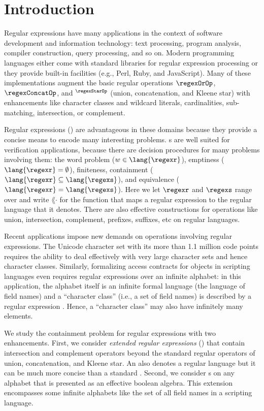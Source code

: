 \section{Introduction}
\label{sec:Introduction}

Regular expressions have many applications in the context of software
development and information technology: text processing, program analysis, compiler
construction, query processing, and so on. Modern programming languages
either come with standard libraries for regular expression processing or they
provide built-in facilities (e.g., Perl, Ruby, and JavaScript). Many
of these implementations augment the basic regular operations $\regexOrOp$,
$\regexConcatOp$, and ${}^\regexStarOp$ (union, concatenation, and
Kleene star) with enhancements like character classes and wildcard
literals, cardinalities, sub-matching, intersection, or
complement.

Regular expressions (\RE) are advantageous in these domains because they provide a concise means to
encode many interesting problems. \RE{}s are well suited for verification applications, because
there are decision procedures for many problems involving them: the word problem
($w\in\lang{\regexr}$), emptiness ($\lang{\regexr}=\emptyset$), finiteness, containment
($\lang{\regexr}\subseteq\lang{\regexs}$), and equivalence ($\lang{\regexr}=\lang{\regexs}$). Here
we let $\regexr$ and $\regexs$ range over \RE{} and write $\lang{\cdot}$ for the function that maps
a regular expression to the regular language that it denotes. There are also effective constructions
for operations like union, intersection, complement, prefixes, suffixes, etc on regular languages.

Recent applications impose new demands on operations involving
regular expressions. The Unicode character set with its more than
1.1 million code points requires the ability to deal effectively with very large
character sets and hence character classes. Similarly, formalizing
access contracts for objects in scripting languages even requires
regular expressions over an infinite alphabet: in this application,
the alphabet itself is an infinite formal language (the language of field
names) and a ``character class'' (i.e., a set of field names) is described
by a regular expression \cite{KeilThiemann2013-Proxy,HeideggerBieniusaThiemann2012-popl}. Hence, a
``character class'' may also have infinitely many elements.

We study the containment problem for regular expressions with two enhancements.
First, we consider \emph{extended regular expressions} (\ERE) that
contain intersection and complement operators beyond the standard regular operators of union, concatenation,
and Kleene star. An \ERE{} also denotes a regular language but it can be much
more concise than a standard \RE.
Second, we consider \ERE{}s on any alphabet that is presented as an effective boolean algebra. This
extension encompasses some infinite alphabets like the set of all field names in a scripting
language. 

